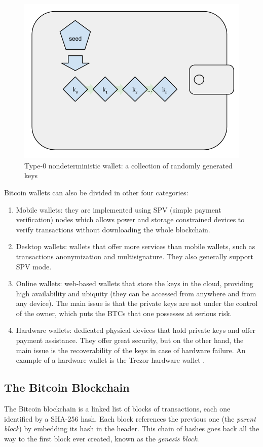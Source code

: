 \begin{figure}[!htb]
	\centering
	\includegraphics[width=0.5\linewidth]{img/deterministic-wallet.png}
	\caption{Type-0 nondeterministic wallet: a collection of randomly generated keys}
	\label{fig:deterministic-wallet}
\end{figure}


Bitcoin wallets can also be divided in other four categories:
\begin{enumerate}
  \item Mobile wallets: they are implemented using SPV (simple payment verification)
  nodes which allows power and storage constrained devices to verify transactions
  without downloading the whole blockchain.
  \item Desktop wallets: wallets that offer more services than mobile wallets,
  such as transactions anonymization and multisignature. They also generally
  support SPV mode.
  \item Online wallets: web-based wallets that store the keys in the cloud, providing
  high availability and ubiquity (they can be accessed from anywhere and from
  any device). The main issue is that the private keys are not under the control
  of the owner, which puts the BTCs that one possesses at serious risk.
  \item Hardware wallets: dedicated physical devices that hold private keys
  and offer payment assistance. They offer great security, but on the other hand,
  the main issue is the recoverability of the keys in case of hardware failure.
  An example of a hardware wallet is the Trezor hardware wallet \cite{trezorwallet}.
\end{enumerate}





\subsection{The Bitcoin Blockchain} The Bitcoin blockchain is a linked list of
blocks of transactions, each one  identified by a SHA-256 hash. Each block
references the previous one (the \emph{parent block}) by embedding its hash in
the header. This chain of hashes goes back all the way to the first block ever
created, known as the \emph{genesis block}.

